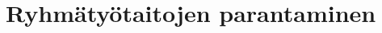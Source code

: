 \documentclass[finnish]{../tktltiki2}
\theoremstyle{definition}
\theoremstyle{remark}
\begin{document}
\section{Ryhmätyötaitojen parantaminen}


%
%
% 
%



\end{document}
